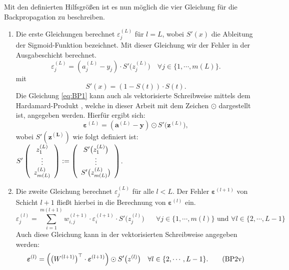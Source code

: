 \noindent
Mit den definierten Hilfsgrößen ist es nun möglich die vier Gleichung für die Backpropagation zu beschreiben. 
 
\begin{enumerate}
\item Die erste Gleichungen berechnet $\varepsilon^{(L)}_j$ für $l=L$, wobei $S'(x)$ die Ableitung der Sigmoid-Funktion bezeichnet. Mit dieser Gleichung wir der Fehler in der Ausgabeschicht berechnet.
\begin{equation}
	\label{eq:BP1}
	\varepsilon^{(L)}_j = (a_j^{(L)} - y_j) \cdot S'\bigl(z_j^{(L)}\bigr)
	\quad \mbox{$\forall j \in \{1, \cdots, m(L)\}$}. \tag{BP1}
\end{equation}
mit
\begin{equation}
	\label{eq:sigmoidPrime}
	S'(x) = (1-S(t)) \cdot S(t).
\end{equation}
Die Gleichung \ref{eq:BP1} kann auch als vektorisierte Schreibweise mittels dem Hardamard-Produkt \cite[S. 353]{walz:2016}, welche in dieser Arbeit mit dem Zeichen $\odot$ dargestellt ist, angegeben werden. Hierfür ergibt sich:
\begin{equation}
  \label{eq:BP1s}
\boldsymbol{\varepsilon}^{(L)} = (\mathbf{a}^{(L)} - \mathbf{y}) \odot S'\bigl(\mathbf{z}^{(L)}\bigr),  \tag{BP1v}
\end{equation}
wobei $S'(\mathbf{z^{(L)}})$ wie folgt definiert ist:
\\[0.2cm]
\hspace*{1.3cm}
$ S'\left(
  \begin{array}[c]{c}
   z_1^{(L)}      \\
   \vdots       \\
   z_{m(L)}^{(L)} 
  \end{array}
  \right) := \left(
  \begin{array}[c]{c}
   S'\bigl(z_1^{(L)}\bigr)      \\
   \vdots       \\
   S'\bigl(z_{m(L)}^{(L)}\bigr)
  \end{array}
  \right)
$.
\\[0.2cm]
    
\item Die zweite Gleichung berechnet $\varepsilon^{(L)}_j$ für alle $l<L$. Der Fehler $\boldsymbol{\varepsilon}^{(l+1)}$ von Schicht $l+1$ fließt hierbei in die Berechnung von $\boldsymbol{\varepsilon}^{(l)}$ ein.
\begin{equation}
	\label{eq:BP2}
	\varepsilon^{(l)}_j = \sum\limits_{i=1}^{m(l+1)} w_{i,j}^{(l+1)} \cdot 			\varepsilon^{(l+1)}_i \cdot S'\bigl(z^{(l)}_j\bigr) \quad \mbox{ $\forall j \in \{1, \cdots, m(l)\}$ und $\forall l \in \{2, \cdots, L-1\}$} \tag{BP2}
\end{equation}
Auch diese Gleichung kann in der vektorisierten Schreibweise angegeben werden:
\begin{equation}
  \label{eq:BP2v}
  \boldsymbol{\varepsilon}^{(l)} = \Bigl(\bigl(W^{(l+1)}\bigr)^\top \cdot \boldsymbol{\varepsilon}^{(l+1)}\Bigr) \odot
  S'\bigl(z^{(l)}\bigr) \quad \mbox{$\forall l \in \{2, \cdots, L-1\}$}. \tag{BP2v}
\end{equation}


\end{enumerate}
